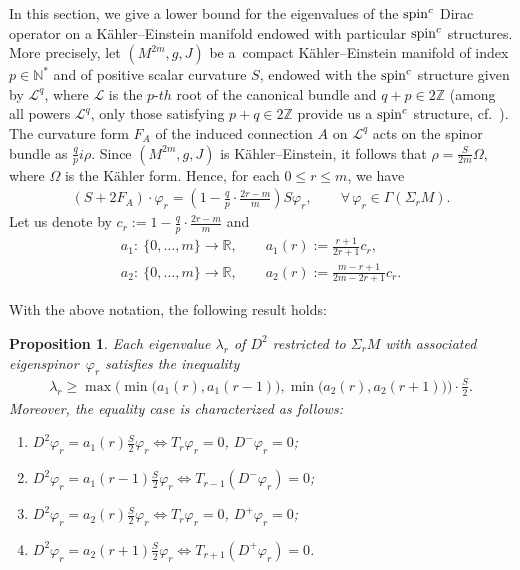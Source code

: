 \documentclass[pdftex]{sigma}
\numberwithin{equation}{section}
\newtheorem{prop}[thm]{Proposition}
\theoremstyle{definition}
\begin{document}
In this section, we give a lower bound for the eigenvalues of the ${\mathop{\rm spin}^c}$ Dirac operator on a K\"ahler--Einstein manifold endowed with particular ${\mathop{\rm spin}^c}$ structures. More precisely, let $(M^{2m},g,J)$ be a~compact K\"ahler--Einstein manifold of index $p\in\mathbb{N}^*$ and of positive scalar curvature $S$, endowed with the ${\mathop{\rm spin}^c}$ structure given by $\mathcal{L}^q$, where $\mathcal L$ is the $p$-$th$ root of the canonical bundle and $q+p\in2\mathbb{Z}$ (among all powers $\mathcal L^q$,
only those satisfying $p+q \in 2\mathbb Z$ provide us a  ${\mathop{\rm spin}^c}$ structure,  cf.~\cite[Section~7]{hmu}). The curvature form $F_A$ of the induced connection $A$ on $\mathcal{L}^q$  acts on the spinor bundle as $\frac{q}{p}i\rho$. Since $(M^{2m},g,J)$ is K\"ahler--Einstein, it follows that $\rho=\frac{S}{2m}\Omega$, where $\Omega$ is the K\"ahler form. Hence,
for each $0\leq r\leq m$, we have
\begin{gather}\label{fa-ke}
(S +2 F_A )\cdot \varphi_r =\left(1-\frac{q}{p}\cdot\frac{2r-m}{m}\right) S \varphi_r, \qquad \forall\, \varphi_r\in\Gamma(\Sigma_{r}M).
\end{gather}
Let us denote by $c_r:=1-\frac{q}{p}\cdot \frac{2r-m}{m}$ and
\begin{gather*}
  a_1\colon \ \{0,\dots,m\} \to \mathbb{R}, \qquad   a_1(r):=\frac{r+1}{2r+1} c_r,\\ %
  a_2\colon \ \{0,\dots,m\} \to \mathbb{R},\qquad    a_2(r):=\frac{m-r+1}{2m-2r+1}c_r.%
\end{gather*}


With the above notation, the following result holds:
\begin{prop}\label{estimgen}
Each eigenvalue $\lambda_r$ of $D^2$ restricted to $\Sigma_{r}M$ with associated eigenspinor~$\varphi_r$ satisfies the inequality
\begin{gather}\label{ineggen}
\lambda_r\geq \max \big (\min \big (a_1(r), a_1(r-1)\big ), \min\big( a_2(r), a_2(r+1)\big)\big)\cdot \frac{S}{2}.
\end{gather}
Moreover, the equality case is characterized as follows:
\begin{enumerate}[$a)$]\itemsep=0pt
 \item $D^2\varphi_r=a_1(r)\frac{S}{2}\varphi_r \Longleftrightarrow T_r\varphi_r=0$, $D^-\varphi_r=0$;
 \item $D^2\varphi_r=a_1(r-1)\frac{S}{2}\varphi_r \Longleftrightarrow  T_{r-1}(D^-\varphi_r)=0$;
 \item $D^2\varphi_r=a_2(r)\frac{S}{2}\varphi_r \Longleftrightarrow T_r\varphi_r=0$, $D^+\varphi_r=0$;
 \item $D^2\varphi_r=a_2(r+1)\frac{S}{2}\varphi_r \Longleftrightarrow  T_{r+1}(D^+\varphi_r)=0$.
\end{enumerate}
\end{prop}
\end{document}
